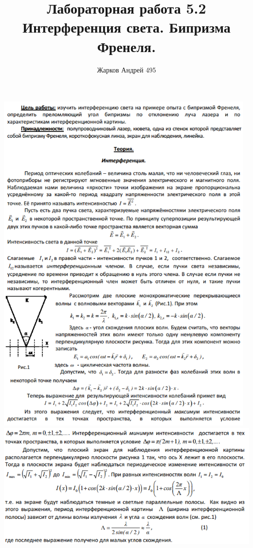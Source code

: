 \documentclass[12pt]{article}
\begin{document}
	\author {Жарков Андрей 495}
	\title {Лабораторная работа 5.2 \\  Интерференция света. Бипризма Френеля.}
    \maketitle{}
    
    \begin{center}
    	\includegraphics[width=13cm]{theory1.png}\\
    	\includegraphics[width=15cm]{theory2.png}\\

\end{center}
\end{document}
